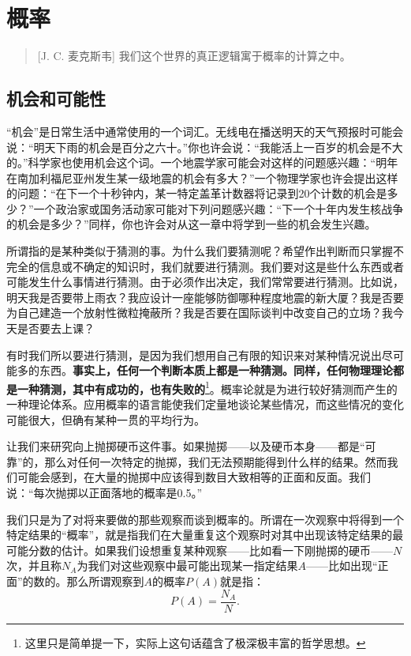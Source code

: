 \chapter{概率}

\begin{quote}[J. C. 麦克斯韦]
我们这个世界的真正逻辑寓于概率的计算之中。
\end{quote}

\section{机会和可能性}

“机会”是日常生活中通常使用的一个词汇。无线电在播送明天的天气预报时可能会说：“明天下雨的机会是百分之六十。”你也许会说：“我能活上一百岁的机会是不大的。”科学家也使用机会这个词。一个地震学家可能会对这样的问题感兴趣：“明年在南加利福尼亚州发生某一级地震的机会有多大？”一个物理学家也许会提出这样的问题：“在下一个十秒钟内，某一特定盖革计数器将记录到20个计数的机会是多少？”一个政治家或国务活动家可能对下列问题感兴趣：“下一个十年内发生核战争的机会是多少？”同样，你也许会对从这一章中将学到一些的机会发生兴趣。

所谓指的是某种类似于猜测的事。为什么我们要猜测呢？希望作出判断而只掌握不完全的信息或不确定的知识时，我们就要进行猜测。我们要对这是些什么东西或者可能发生什么事情进行猜测。由于必须作出决定，我们常常要进行猜测。比如说，明天我是否要带上雨衣？我应设计一座能够防御哪种程度地震的新大厦？我是否要为自己建造一个放射性微粒掩蔽所？我是否要在国际谈判中改变自己的立场？我今天是否要去上课？

有时我们所以要进行猜测，是因为我们想用自己有限的知识来对某种情况说出尽可能多的东西。\textbf{事实上，任何一个判断本质上都是一种猜测。同样，任何物理理论都是一种猜测，其中有成功的，也有失败的}\footnote{这里只是简单提一下，实际上这句话蕴含了极深极丰富的哲学思想。}。概率论就是为进行较好猜测而产生的一种理论体系。应用概率的语言能使我们定量地谈论某些情况，而这些情况的变化可能很大，但确有某种一贯的平均行为。

让我们来研究向上抛掷硬币这件事。如果抛掷——以及硬币本身——都是“可靠”的，那么对任何一次特定的抛掷，我们无法预期能得到什么样的结果。然而我们可能会感到，在大量的抛掷中应该得到数目大致相等的正面和反面。我们说：“每次抛掷以正面落地的概率是0.5。”

我们只是为了对将来要做的那些观察而谈到概率的。所谓在一次观察中将得到一个特定结果的“概率”，就是指我们在大量重复这个观察时对其中出现该特定结果的最可能分数的估计。如果我们设想重复某种观察——比如看一下刚抛掷的硬币——$N$次，并且称$N_A$为我们对这些观察中最可能出现某一指定结果$A$——比如出现“正面”的数的。那么所谓观察到$A$的概率$P(A)$就是指：
\begin{equation}
\label{Eq:I:6:1}
P(A)=\frac{N_A}{N}.
\end{equation}

